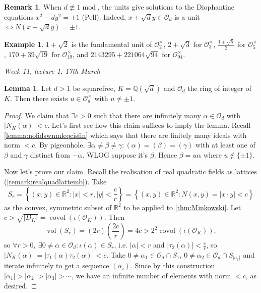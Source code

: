 \documentclass{article}
\newcommand{\Q}{\mathbb{Q}}
\newcommand{\R}{\mathbb{R}}
\newcommand{\Mod}{\operatorname{mod}}
\newcommand{\vol}{\operatorname{vol}}
\newcommand{\covol}{\operatorname{covol}}
\newcommand{\ri}{\mathcal{O}}
\theoremstyle{definition}
\newtheorem{lemma}[defn]{Lemma}
\newtheorem{example}[defn]{Example}
\newtheorem{remark}[defn]{Remark}
\begin{document}
\begin{remark}
When $d\not\equiv 1\Mod $, the units give solutions to the Diophantine equations $x^2-dy^2=\pm 1$ (Pell). Indeed, $x+\sqrt dy\in\ri_d$ is a unit $\iff N\left(x+\sqrt{d}y\right)=\pm 1$.
\end{remark}

\begin{example}
$1+\sqrt 2$ is the fundamental unit of $\ri_2^\times$, $2+\sqrt 3$ for $\ri_3^\times$, $\frac{1+\sqrt 5}{2}$ for $\ri_5^\times$, $170+39\sqrt{19}$ for $\ri_{19}^\times$, and $2143295+221064\sqrt{94}$ for $\ri_{94}^\times$.
\end{example}

\begin{flushright}
\textit{Week 11, lecture 1, 17th March}
\end{flushright}

\begin{lemma}
Let $d>1$ be squarefree, $K=\Q\left(\sqrt d\right)$ and $\ri_d$ the ring of integer of $K$. Then there exists $u\in\ri_d^\times$ with $u\neq\pm 1$.
\end{lemma}
\begin{proof}
We claim that $\exists c>0$ such that there are infinitely many $\alpha\in\ri_d$ with $|N_K(\alpha)|<c$. Let's first see how this claim suffices to imply the lemma. Recall \ref{lemma:nofidswnmleqcisfin} which says that there are finitely many ideals with norm $<c$. By pigeonhole, $\exists\alpha\neq\beta\neq\gamma:(\alpha)=(\beta)=(\gamma)$ with at least one of $\beta$ and $\gamma$ distinct from $-\alpha$. WLOG suppose it's $\beta$. Hence $\beta=u\alpha$ where $u\notin\{\pm 1\}$.

Now let's prove our claim. Recall the realisation of real quadratic fields as lattices (\ref{remark:realquadlattemb}). Take
\[
S_r=\left\{(x,y)\in\R^2:|x|<r,|y|<\frac{c}{r}\right\}=\left\{(x,y)\in\R^2:N(x,y)=|x\cdot y|<c\right\}
\]
as the convex, symmetric subset of $\R^2$ to be applied to \ref{thm:Minkowski}. Let $c>\sqrt{|D_K|}=\covol(\iota(\ri_K))$. Then
\[
\vol(S_r)=(2r)\left(\frac{2c}{r}\right)=4c>2^2\covol(\iota(\ri_K)),
\]
so $\forall r>0,\ \exists 0\neq\alpha\in\ri_d:\iota(\alpha)\in S_r$, i.e. $|\alpha|<r$ and $|\tau_2(\alpha)|<\frac{c}{r}$, so $|N_K(\alpha)|=|\tau_1(\alpha)\tau_2(\alpha)|<c$. Take $0\neq\alpha_1\in\ri_d\cap S_1$, $0\neq\alpha_2\in\ri_d\cap S_{|a_1|}$ and iterate infinitely to get a sequence $(\alpha_i)$. Since by this construction $|\alpha_1|>|\alpha_2|>|\alpha_3|>\cdots$, we have an infinite number of elements with norm $<c$, as desired.
\end{proof}
\end{document}

